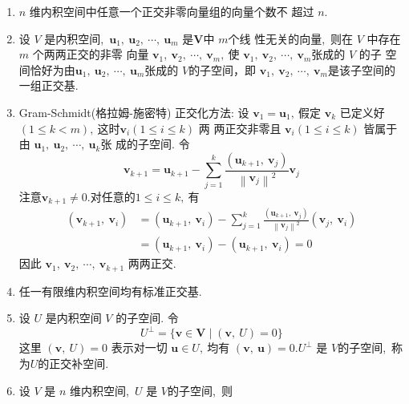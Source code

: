 \begin{enumerate}
		\item $ n$  维内积空间中任意一个正交非零向量组的向量个数不 超过 $ n .$
		\item 设 $V $ 是内积空间,\  $ \boldsymbol{u}_{1},\  \boldsymbol{u}_{2},\  \cdots,\  \boldsymbol{u}_{m}$  是$  \boldsymbol{V}  $中  $m  $个线 性无关的向量,\  则在 $V$  中存在 $ m$  个两两正交的非零 向量  $\boldsymbol{v}_{1},\  \boldsymbol{v}_{2},\  \cdots,\  \boldsymbol{v}_{m} ,\  $使  $\boldsymbol{v}_{1},\  \boldsymbol{v}_{2},\  \cdots,\  \boldsymbol{v}_{m}  $张成的 $ V$  的子 空间恰好为由$  \boldsymbol{u}_{1},\  \boldsymbol{u}_{2},\  \cdots,\  \boldsymbol{u}_{m}  $张成的 $ V  $的子空间，即  $\boldsymbol{v}_{1},\  \boldsymbol{v}_{2},\  \cdots,\  \boldsymbol{v}_{m}  $是该子空间的一组正交基.
		\item Gram-Schmidt(格拉姆-施密特) 正交化方法: 设  $\boldsymbol{v}_{1}=\boldsymbol{u}_{1} ,\  $假定 $ \boldsymbol{v}_{k}$  已定义好 $ (1 \leqslant k<m) ,\  $这时$  \boldsymbol{v}_{i}(1 \leqslant i \leqslant k) $ 两 两正交非零且  $\boldsymbol{v}_{i}(1 \leqslant i \leqslant k)$  皆属于由 $ \boldsymbol{u}_{1},\  \boldsymbol{u}_{2},\  \cdots,\  \boldsymbol{u}_{k}  $张 成的子空间. 令
		$$\boldsymbol{v}_{k+1}=\boldsymbol{u}_{k+1}-\sum_{j=1}^{k} \frac{\left(\boldsymbol{u}_{k+1},\  \boldsymbol{v}_{j}\right)}{\left\|\boldsymbol{v}_{j}\right\|^{2}} \boldsymbol{v}_{j}$$
		注意$ \boldsymbol{v}_{k+1} \neq 0 . $对任意的$  1 \leqslant i \leqslant k ,\  $有
		$$\begin{aligned}
			\left(\boldsymbol{v}_{k+1},\  \boldsymbol{v}_{i}\right) &=\left(\boldsymbol{u}_{k+1},\  \boldsymbol{v}_{i}\right)-\sum_{j=1}^{k} \frac{\left(\boldsymbol{u}_{k+1},\  \boldsymbol{v}_{j}\right)}{\left\|\boldsymbol{v}_{j}\right\|^{2}}\left(\boldsymbol{v}_{j},\  \boldsymbol{v}_{i}\right) \\
			&=\left(\boldsymbol{u}_{k+1},\  \boldsymbol{v}_{i}\right)-\left(\boldsymbol{u}_{k+1},\  \boldsymbol{v}_{i}\right)=0
		\end{aligned}$$
		因此  $\boldsymbol{v}_{1},\  \boldsymbol{v}_{2},\  \cdots,\  \boldsymbol{v}_{k+1}$  两两正交.
		\item 任一有限维内积空间均有标准正交基.
		\item 设 $ U $ 是内积空间  $V$  的子空间. 令
		$$U^{\perp}=\{\boldsymbol{v} \in \boldsymbol{V} \mid(\boldsymbol{v},\  U)=0\}$$
		这里 $ (\boldsymbol{v},\  U)=0 $ 表示对一切 $ \boldsymbol{u} \in U ,\  $均有 $ (\boldsymbol{v},\  \boldsymbol{u})=0 .  U^{\perp} $ 是 $ V  $的子空间,\  称为$  U  $的正交补空间.
		\item 设  $V$  是 $ n$  维内积空间,\  $ U $ 是 $ V  $的子空间,\  则\\

\end{enumerate}
